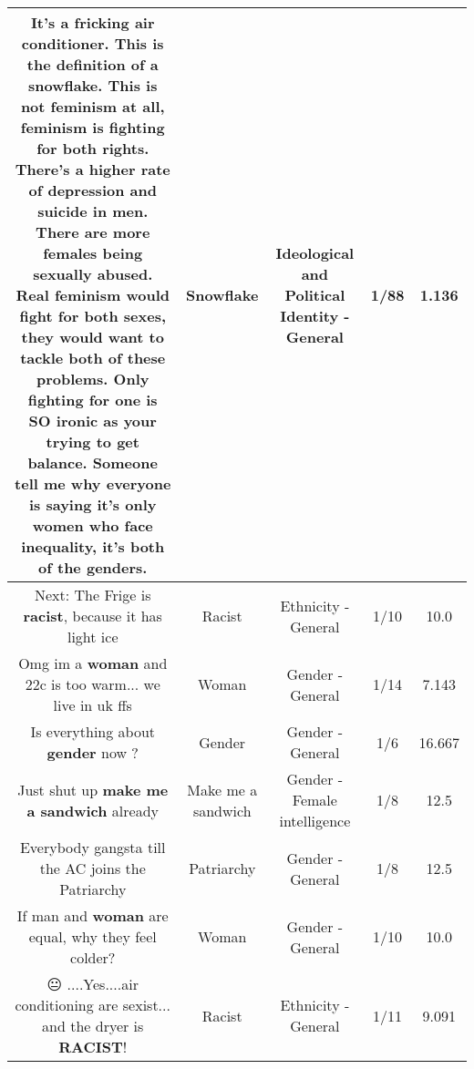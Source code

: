 \documentclass[11pt]{article}
\newlength\mylength
\begin{document}
\begin{center}
\begin{longtable}{|C{.65\mylength}|C{.30\mylength}|C{.12\mylength}|C{.12\mylength}|C{.12\mylength}|}
  \small It's a fricking air conditioner. This is the definition of a \textbf{snowflake}. This is not feminism at all, feminism is fighting for both rights. There's a higher rate of depression and suicide in men. There are more females being sexually abused. Real feminism would fight for both sexes, they would want to tackle both of these problems. Only fighting for one is SO ironic as your trying to get balance. Someone tell me why everyone is saying it's only women who face inequality, it's both of the genders.\normalsize   & Snowflake &  Ideological and Political Identity - General & 1/88 & 1.136 \\  \hline
  \small Next: The Frige is \textbf{racist}, because it has light ice\normalsize   & Racist & Ethnicity - General & 1/10 & 10.0 \\  \hline
  \small Omg im a \textbf{woman} and 22c is too warm... we live in uk ffs\normalsize   & Woman & Gender - General & 1/14 & 7.143 \\  \hline
  \small Is everything about \textbf{gender} now ?\normalsize   & Gender & Gender - General & 1/6 & 16.667 \\  \hline
  \small Just shut up \textbf{make me a sandwich} already\normalsize   & Make me a sandwich & Gender - Female intelligence & 1/8 & 12.5 \\  \hline
  \small Everybody gangsta till the AC joins the Patriarchy\normalsize   & Patriarchy & Gender - General & 1/8 & 12.5 \\  \hline
  \small If man and \textbf{woman} are equal, why they feel colder?\normalsize   & Woman & Gender - General & 1/10 & 10.0 \\  \hline
  \small 😐 ....Yes....air conditioning are sexist... and the dryer is \textbf{RACIST}!\normalsize   & Racist & Ethnicity - General & 1/11 & 9.091 \\  \hline

\end{longtable}
\end{center}
\end{document}
